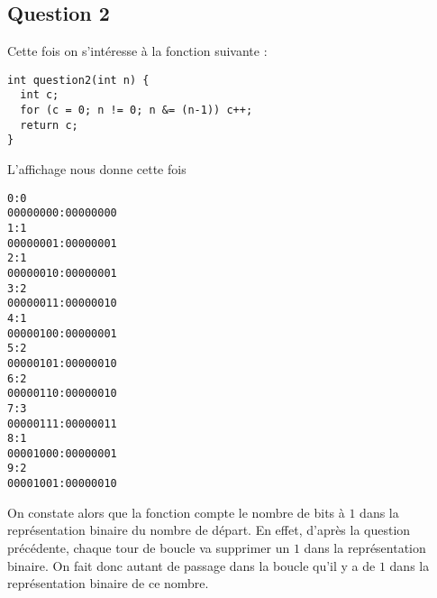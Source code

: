 \documentclass{article}
\begin{document}
\subsection{Question 2}

Cette fois on s'intéresse à la fonction suivante :
\begin{verbatim}
int question2(int n) {
  int c;
  for (c = 0; n != 0; n &= (n-1)) c++;
  return c;
}
\end{verbatim}

L'affichage nous donne cette fois
\begin{verbatim}
0:0
00000000:00000000
1:1
00000001:00000001
2:1
00000010:00000001
3:2
00000011:00000010
4:1
00000100:00000001
5:2
00000101:00000010
6:2
00000110:00000010
7:3
00000111:00000011
8:1
00001000:00000001
9:2
00001001:00000010
\end{verbatim}

On constate alors que la fonction compte le nombre de bits à \(1\) dans la représentation binaire du nombre de départ. En effet, d'après la question précédente, chaque tour de boucle va supprimer un \(1\) dans la représentation binaire. On fait donc autant de passage dans la boucle qu'il y a de \(1\) dans la représentation binaire de ce nombre.
\end{document}
